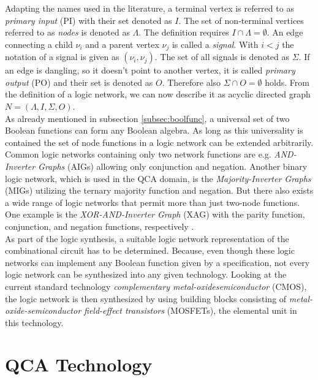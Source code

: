 Adapting the names used in the literature, a terminal vertex is referred to as \textit{primary input} (PI) with their set denoted as $I$. The set of non-terminal vertices referred to as \textit{nodes} is denoted as $\Lambda$. The definition requires $I \cap \Lambda = \emptyset$. An edge connecting a child $\nu_i$ and a parent vertex $\nu_j$ is called a \textit{signal}. With $i < j$ the notation of a signal is given as $(\nu_i, \nu_j)$. The set of all signals is denoted as $\Sigma$. If an edge is dangling, so it doesn't point to another vertex, it is called \textit{primary output} (PO) and their set is denoted as $O$. Therefore also $\Sigma \cap O = \emptyset$ holds. From the definition of a logic network, we can now describe it as acyclic directed graph $N = (\Lambda, I, \Sigma, O)$.\\
As already mentioned in subsection \ref{subsec:boolfunc}, a universal set of two Boolean functions can form any Boolean algebra.
As long as this universality is contained the set of node functions in a logic network can be extended arbitrarily. Common logic networks containing only two network functions are e.g. \textit{AND-Inverter Graphs} (AIGs) allowing only conjunction and negation. Another binary logic network, which is used in the QCA domain, is the \textit{Majority-Inverter Graphs} (MIGs) utilizing the ternary majority function and negation. But there also exists a wide range of logic networks that permit more than just two-node functions. One example is the \textit{XOR-AND-Inverter Graph} (XAG) with the parity function, conjunction, and negation functions, respectively \cite{Walter}.\\
As part of the logic synthesis, a suitable logic network representation of the combinational circuit has to be determined. Because, even though these logic networks can implement any Boolean function given by a specification, not every logic network can be synthesized into any given technology.
Looking at the current standard technology \textit{complementary metal-oxidesemiconductor} (CMOS), the logic network is then synthesized by using building blocks consisting of \textit{metal-oxide-semiconductor field-effect transistors} (MOSFETs), the elemental unit in this technology.\\


\section{QCA Technology}

